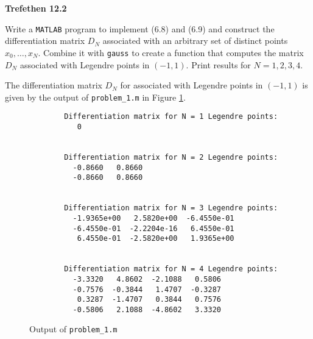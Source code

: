 \textbf{Trefethen 12.2}

Write a \texttt{MATLAB} program to implement (6.8) and (6.9) and construct the differentiation matrix $D_N$ associated
with an arbitrary set of distinct points $x_0, \ldots, x_N$. Combine it with \texttt{gauss} to create a function that
computes the matrix $D_N$ associated with Legendre points in $(-1, 1)$. Print results for $N = 1, 2, 3, 4$.

\begin{solution}
    The differentiation matrix $D_N$ for associated with Legendre points in $(-1, 1)$ is given by the output of
    \texttt{problem\_1.m} in Figure \ref{fig:problem_1}.

    \begin{figure}[h]
        \begin{verbatim}
        Differentiation matrix for N = 1 Legendre points: 
           0
        
        
        Differentiation matrix for N = 2 Legendre points: 
          -0.8660   0.8660
          -0.8660   0.8660
        
        
        Differentiation matrix for N = 3 Legendre points: 
          -1.9365e+00   2.5820e+00  -6.4550e-01
          -6.4550e-01  -2.2204e-16   6.4550e-01
           6.4550e-01  -2.5820e+00   1.9365e+00
        
        
        Differentiation matrix for N = 4 Legendre points: 
          -3.3320   4.8602  -2.1088   0.5806
          -0.7576  -0.3844   1.4707  -0.3287
           0.3287  -1.4707   0.3844   0.7576
          -0.5806   2.1088  -4.8602   3.3320 
        \end{verbatim}
        \caption{Output of \texttt{problem\_1.m}}
        \label{fig:problem_1}
    \end{figure}
    \ \\
\end{solution}